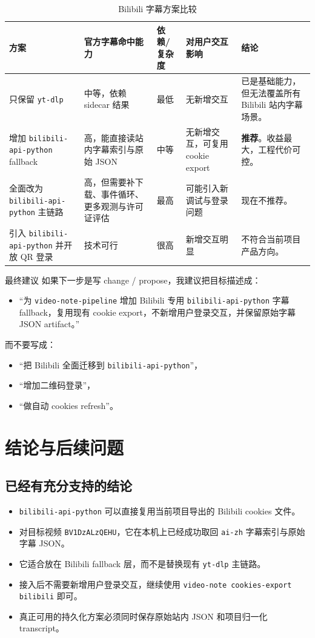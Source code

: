 \documentclass[a4paper]{article}
\begin{document}
\begin{table}[H]
\centering
\begin{tabularx}{\textwidth}{p{3.2cm}p{2.5cm}p{2.3cm}p{2.0cm}Y}
\toprule
方案 & 官方字幕命中能力 & 依赖/复杂度 & 对用户交互影响 & 结论 \\
\midrule
只保留 \texttt{yt-dlp} & 中等，依赖 sidecar 结果 & 最低 & 无新增交互 & 已是基础能力，但无法覆盖所有 Bilibili 站内字幕场景。 \\
增加 \texttt{bilibili-api-python} fallback & 高，能直接读站内字幕索引与原始 JSON & 中等 & 无新增交互，可复用 cookie export & \textbf{推荐}。收益最大，工程代价可控。 \\
全面改为 \texttt{bilibili-api-python} 主链路 & 高，但需要补下载、事件循环、更多观测与许可证评估 & 最高 & 可能引入新调试与登录问题 & 现在不推荐。 \\
引入 \texttt{bilibili-api-python} 并开放 QR 登录 & 技术可行 & 很高 & 新增交互明显 & 不符合当前项目产品方向。 \\
\bottomrule
\end{tabularx}
\caption{Bilibili 字幕方案比较}
\end{table}

\begin{findingbox}{最终建议}
如果下一步是写 change / propose，我建议把目标描述成：
\begin{itemize}
\item ``为 \texttt{video-note-pipeline} 增加 Bilibili 专用 \texttt{bilibili-api-python} 字幕 fallback，复用现有 cookie export，不新增用户登录交互，并保留原始字幕 JSON artifact。''
\end{itemize}
而不要写成：
\begin{itemize}
\item ``把 Bilibili 全面迁移到 \texttt{bilibili-api-python}''，
\item ``增加二维码登录''，
\item ``做自动 cookies refresh''。
\end{itemize}
\end{findingbox}

\section{结论与后续问题}

\subsection{已经有充分支持的结论}

\begin{itemize}
\item \texttt{bilibili-api-python} 可以直接复用当前项目导出的 Bilibili cookies 文件。
\item 对目标视频 \texttt{BV1DzALzQEHU}，它在本机上已经成功取回 \texttt{ai-zh} 字幕索引与原始字幕 JSON。
\item 它适合放在 Bilibili fallback 层，而不是替换现有 \texttt{yt-dlp} 主链路。
\item 接入后不需要新增用户登录交互，继续使用 \texttt{video-note cookies-export bilibili} 即可。
\item 真正可用的持久化方案必须同时保存原始站内 JSON 和项目归一化 transcript。
\end{itemize}
\end{document}
